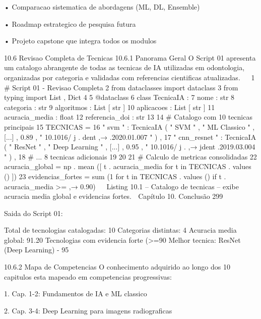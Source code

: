          • Comparacao sistematica de abordagens (ML, DL, Ensemble)

         • Roadmap estrategico de pesquisa futura

         • Projeto capstone que integra todos os modulos


     10.6      Revisao Completa de Tecnicas
     10.6.1     Panorama Geral
     O Script 01 apresenta um catalogo abrangente de todas as tecnicas de IA utilizadas
     em odontologia, organizadas por categoria e validadas com referencias cientificas
     atualizadas.
                                                                                                        
 1 # Script 01 - Revisao Completa
 2 from dataclasses import dataclass
 3 from typing import List , Dict
 4
 5 @dataclass
 6 class TecnicaIA :
 7     nome : str
 8     categoria : str
 9     algoritmos : List [ str ]
10     aplicacoes : List [ str ]
11     acuracia_media : float
12     referencia_doi : str
13
14 # Catalogo com 10 tecnicas principais
15 TECNICAS = {
16     " svm " : TecnicaIA ( " SVM " , " ML Classico " , [...] , 0.89 , " 10.1016/ j . dent
         ,→ .2020.01.007 " ) ,
17        " cnn_resnet " : TecnicaIA ( " ResNet " , " Deep Learning " , [...] , 0.95 , " 10.1016/ j .
         ,→ jdent .2019.03.004 " ) ,
18        # ... 8 tecnicas adicionais
19 }
20
21 # Calculo de metricas consolidadas
22 acuracia_global = np . mean ([ t . acuracia_media for t in TECNICAS . values () ])
23 evidencias_fortes = sum (1 for t in TECNICAS . values () if t . acuracia_media >=
         ,→ 0.90)
                                                                                                        
     Listing 10.1 – Catalogo de tecnicas – exibe acuracia media global e evidencias fortes.
  Capítulo 10. Conclusão                                                                      299



     Saida do Script 01:

       Total de tecnologias catalogadas: 10
       Categorias distintas: 4
       Acuracia media global: 91.20%
       Tecnologias com evidencia forte (>=90%
       Melhor tecnica: ResNet (Deep Learning) - 95%


  10.6.2     Mapa de Competencias
  O conhecimento adquirido ao longo dos 10 capitulos esta mapeado em competencias
  progressivas:

     1. Cap. 1-2: Fundamentos de IA e ML classico

     2. Cap. 3-4: Deep Learning para imagens radiograficas

